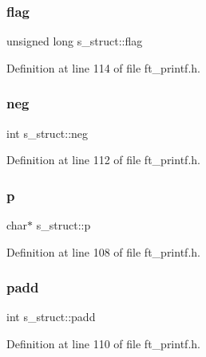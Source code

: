 \subsubsection{\texorpdfstring{flag}{flag}}
{\footnotesize\ttfamily unsigned long s\+\_\+struct\+::flag}



Definition at line 114 of file ft\+\_\+printf.\+h.

\mbox{\label{structs__struct_ace92ae76259d4ffe5e9d8a01d6548127}} 
\subsubsection{\texorpdfstring{neg}{neg}}
{\footnotesize\ttfamily int s\+\_\+struct\+::neg}



Definition at line 112 of file ft\+\_\+printf.\+h.

\mbox{\label{structs__struct_a13dc65f84777d75bdc5cab593f16ba95}} 
\subsubsection{\texorpdfstring{p}{p}}
{\footnotesize\ttfamily char$\ast$ s\+\_\+struct\+::p}



Definition at line 108 of file ft\+\_\+printf.\+h.

\mbox{\label{structs__struct_aa1956d6e75a6d5a101336449b7ab3f73}} 
\subsubsection{\texorpdfstring{padd}{padd}}
{\footnotesize\ttfamily int s\+\_\+struct\+::padd}



Definition at line 110 of file ft\+\_\+printf.\+h.

\mbox{\label{structs__struct_ae9c5f8011938c4b363b04995563a2fc6}} 
